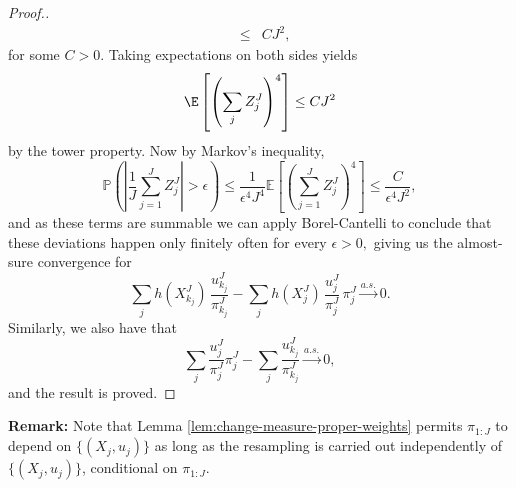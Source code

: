 \begin{proof}[Proof.]
\begin{eqnarray}
    &\leq& CJ^2,
    \end{eqnarray}
    for some $C>0$. 
    Taking expectations on both sides yields
    \begin{equation}\E\left[\left(\sum_j Z_j^J\right)^4 \right]  \leq CJ^2\end{equation}
    by the tower property. Now by Markov's inequality, 
    \begin{equation}\mathbb{P}\left(\left|\frac{1}{J} \sum_{j=1}^J Z_j^J\right|>\epsilon \right) 
    \leq \frac{1}{\epsilon^4J^4 } 
    \mathbb{E}\left[\left(\sum_{j=1}^J Z_j^J\right)^4\right] \leq \frac{C}{\epsilon^4J^2},\end{equation}
    and as these terms are summable we can apply Borel-Cantelli to conclude that these deviations happen only finitely often for every $\epsilon>0,$ giving us the almost-sure convergence for   
    \begin{equation} 
    \sum_j h(X_{k_j}^J)\, \frac{u_{k_j}^J}{\pi_{k_j}^J}
    -  \sum_j h(X_j^J)\, \frac{u_j^J}{\pi_j^J}\, \pi_j^J \stackrel{a.s.}{\to} 0.
    \end{equation} 
    Similarly, we also have that
    \begin{equation} 
    \sum_j \frac{u_j^J}{\pi_j^J}\pi_j^J
    - \sum_j \frac{u_{k_j}^J}{\pi_{k_j}^J} \stackrel{a.s.}{\to} 0,
    \end{equation}
    and the result is proved. 

    
    
\end{proof}


\noindent \textbf{Remark:} Note that Lemma \ref{lem:change-measure-proper-weights} permits $\pi_{1:J}$ to depend on $\{(X_j,u_j)\}$ as long as the resampling is carried out independently of $\{(X_j,u_j)\}$, conditional on $\pi_{1:J}$.

